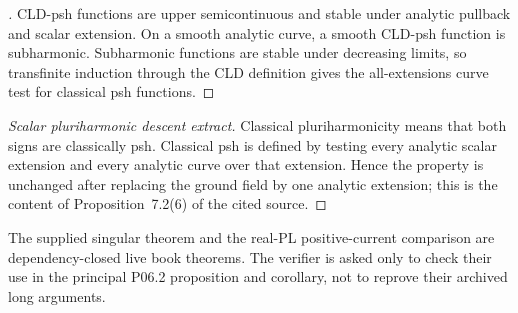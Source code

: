
\begin{proof}[]
CLD-psh functions are upper semicontinuous and stable under analytic
pullback and scalar extension.  On a smooth analytic curve, a smooth
CLD-psh function is subharmonic.  Subharmonic functions are stable under
decreasing limits, so transfinite induction through the CLD definition
gives the all-extensions curve test for classical psh functions.
\end{proof}

\begin{proof}[Scalar pluriharmonic descent extract]
Classical pluriharmonicity means that both signs are classically psh.
Classical psh is defined by testing every analytic scalar extension and
every analytic curve over that extension.  Hence the property is unchanged
after replacing the ground field by one analytic extension; this is the
content of Proposition~7.2(6) of the cited source.
\end{proof}

The supplied singular theorem and the real-PL positive-current comparison
are dependency-closed live book theorems.  The verifier is asked only to
check their use in the principal P06.2 proposition and corollary, not to
reprove their archived long arguments.
